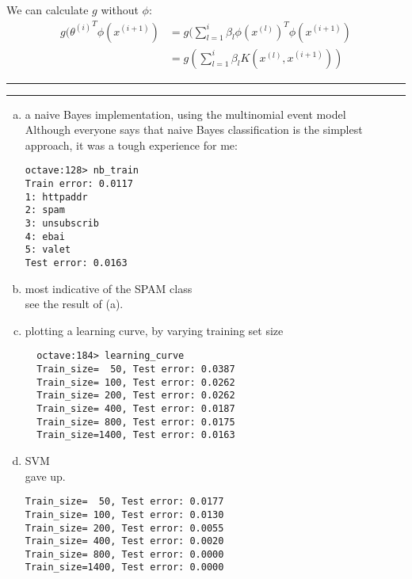 \documentclass[11pt]{article}
\newcommand{\question}[2] {\vspace{.25in} \hrule\vspace{0.5em}
\noindent{\bf #1: #2} \vspace{0.5em}
\hrule \vspace{.10in}}
\begin{document}
We can calculate $g$ without $\phi$:\
\begin{align*}
  g({\theta^{(i)}}^T \phi(x^{(i+1)})
  &= g(\sum_{l=1}^i \beta_l \phi(x^{(l)})^T \phi(x^{(i+1)})\\
  &= g(\sum_{l=1}^i \beta_l K(x^{(l)},x^{(i+1)}))
\end{align*}
\question{3}{Spam classification}
\begin{enumerate}[(a)]
\item a naive Bayes implementation, using the multinomial event model\\
Although everyone says that naive Bayes classification is the simplest approach, it was a tough experience for me:
\begin{verbatim}
octave:128> nb_train
Train error: 0.0117
1: httpaddr
2: spam
3: unsubscrib
4: ebai
5: valet
Test error: 0.0163
\end{verbatim}

\item most indicative of the SPAM class\\
  see the result of (a).

\item plotting a learning curve, by varying training set size\\  
\begin{verbatim}
  octave:184> learning_curve
  Train_size=  50, Test error: 0.0387
  Train_size= 100, Test error: 0.0262
  Train_size= 200, Test error: 0.0262
  Train_size= 400, Test error: 0.0187
  Train_size= 800, Test error: 0.0175
  Train_size=1400, Test error: 0.0163
\end{verbatim}

\item SVM\\
  gave up.
\begin{verbatim}
Train_size=  50, Test error: 0.0177
Train_size= 100, Test error: 0.0130
Train_size= 200, Test error: 0.0055
Train_size= 400, Test error: 0.0020
Train_size= 800, Test error: 0.0000
Train_size=1400, Test error: 0.0000
\end{verbatim}


\end{enumerate}
\end{document}
